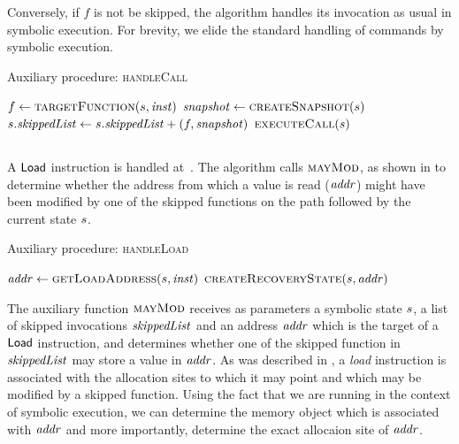 Conversely, if $f$ is not be skipped, the algorithm handles its
invocation as usual in symbolic execution.  For brevity, we elide the
standard handling of commands by symbolic execution.

\begin{algorithm}
  \caption{Auxiliary procedure: \textsc{handleCall}
  \label{fig:aux-handle-call}}
\begin{algorithmic}[1]

\State $f \gets  \Call{targetFunction}{\workstate, \inst}$ \label{alg:call-find-target}
  \State $\snapshot \gets \Call{createSnapshot}{\workstate}$ \label{alg:take-snapshot}
  \State $s.\mathit{skippedList} \gets s.\mathit{skippedList} + (f,\mathit{snapshot})$ \label{alg:record-snapshot}
\Else
  \State $\Call{executeCall}{\workstate}$ \label{alg:call-normal}
\EndIf
\EndFunction
\end{algorithmic}
\end{algorithm}

\subsection{}
A $\mathsf{Load}$ instruction is handled at~.
The algorithm calls $\textsc{mayMod}$,
as shown in 
to determine whether the address from
which a value is read ($\mathit{addr}$) might have been modified by one of the
skipped functions on the path followed by the current state $s$.

\begin{algorithm}
  \caption{Auxiliary procedure: \textsc{handleLoad}
  \label{fig:aux-handle-load}}
\begin{algorithmic}[1]

\State $\addr \gets \Call{getLoadAddress}{\workstate, \inst}$
  \State $\Call{createRecoveryState}{\workstate,\addr}$ \label{alg:call-recover}
\Else
  \State {}  \label{alg:load-normal}
\EndIf
\EndFunction
\end{algorithmic}
\end{algorithm}

The auxiliary function $\textsc{mayMod}$
receives as parameters a symbolic state $s$, a list of
skipped invocations $\mathit{skippedList}$ and an address $\mathit{addr}$ which is the
target of a $\mathsf{Load}$ instruction, and determines whether one
of the skipped function in $\mathit{skippedList}$ may store a value in $\mathit{addr}$.
As was described in ,
a \textit{load} instruction is associated with the allocation sites to
which it may point and which may be modified by a skipped function.
Using the fact that we are running in the context of symbolic execution,
we can determine the memory object which is associated with $\mathit{addr}$ and more importantly,
determine the exact allocaion site of $\mathit{addr}$.

